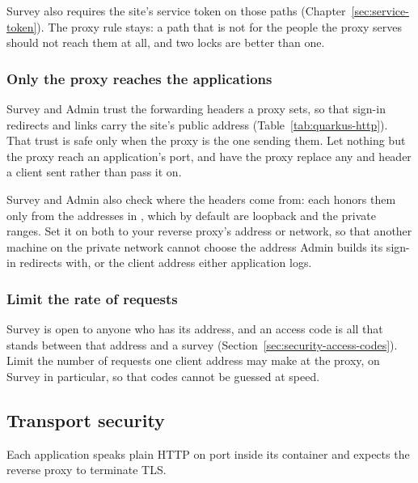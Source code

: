 \documentclass[11pt, a4paper]{article}
\begin{document}
Survey also requires the site's service token on those  paths
(Chapter~\ref{sec:service-token}). The proxy rule stays: a path that is not for the people the
proxy serves should not reach them at all, and two locks are better than one.

\subsubsection*{Only the proxy reaches the applications}

Survey and Admin trust the forwarding headers a proxy sets, so that sign-in redirects and links
carry the site's public address (Table~\ref{tab:quarkus-http}). That trust is safe only when
the proxy is the one sending them. Let nothing but the proxy reach an application's port, and
have the proxy replace any  and  header
a client sent rather than pass it on.

Survey and Admin also check where the headers come from: each honors them only from the
addresses in , which by default are loopback and the private
ranges. Set it on both to your reverse proxy's address or network, so that another machine on
the private network cannot choose the address Admin builds its sign-in redirects with, or the
client address either application logs.

\subsubsection*{Limit the rate of requests}

Survey is open to anyone who has its address, and an access code is all that stands between
that address and a survey (Section~\ref{sec:security-access-codes}). Limit the number of
requests one client address may make at the proxy, on Survey in particular, so that codes
cannot be guessed at speed.

\subsection{Transport security}
\label{sec:security-transport}

Each application speaks plain HTTP on port  inside its container and expects the
reverse proxy to terminate TLS.
\end{document}
